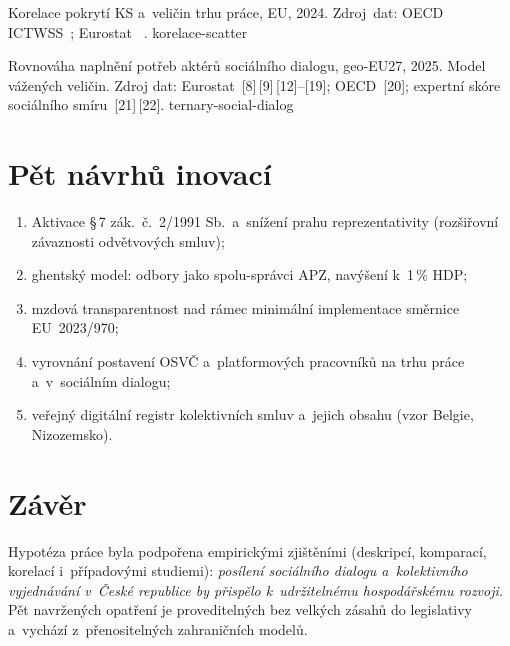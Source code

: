 \documentclass[czech]{CTUposter}
\begin{document}
\begin{posterbody}
\begin{minipage}[t]{0.485\linewidth}
    {Korelace pokrytí \acs{KS} a~veličin trhu práce, \acs{EU}, 2024. Zdroj~dat: \acs{OECD} \acs{ICTWSS}~\cite{oecd_aias_ictwss_CBC_ERB_pct}; Eurostat~\cite{eurostat_lfsa_ewhan2_HR_weekly} \cite{eurostat_gpg} \cite{eurostat_earn_nt_net_PPS_AW100} \cite{eurostat_nama_10_lp_ulc_NLPR_HW_EU27eq100}.}%
    {korelace-scatter}%
\end{minipage}%
\hfill%
\begin{minipage}[t]{0.485\linewidth}
  \nocite{eurostat_ilc_di01,eurostat_jvs_a_r21,eurostat_lc_lci_lev,eurostat_prc_ppp_ind_PLI_GDP,eurostat_nama_10_gdp,eurostat_nama_10_pc,eurostat_lfsi_emp_a,eurostat_ilc_di12,oecd_cts_cit,ilostat_STR_DAYS_ECO_RT_A,CMKOS_ZpravaKV2025}%
    {Rovnováha naplnění potřeb aktérů sociálního dialogu, \acs{geo-EU27}, 2025. Model vážených veličin. Zdroj dat: Eurostat~[8]\,[9]\,[12]--[19]; \acs{OECD}~[20]; expertní skóre sociálního smíru~[21]\,[22].}%
    {ternary-social-dialog}%
\end{minipage}%
\par\vspace{2mm}

\section{Pět návrhů inovací}
\begin{enumerate}
  \item Aktivace \S\,7 zák.\ č.\ 2/1991 Sb.\ a~snížení prahu reprezentativity (rozšiřovní závaznosti odvětvových smluv);
  \item ghentský model: odbory jako spolu-správci APZ, navýšení k~1\,\% HDP;
  \item mzdová transparentnost nad rámec minimální implementace směrnice EU~2023/970;
  \item vyrovnání postavení OSVČ a~platformových pracovníků na trhu práce a~v~sociálním dialogu;
  \item veřejný digitální registr kolektivních smluv a~jejich obsahu (vzor Belgie, Nizozemsko).
\end{enumerate}

\section{Závěr}
Hypotéza práce byla podpořena empirickými zjištěními (deskripcí, komparací, korelací i~případovými studiemi): \emph{posílení sociálního dialogu a~kolektivního vyjednávání v~České republice by přispělo k~udržitelnému hospodářskému rozvoji.} Pět
navržených opatření je proveditelných bez velkých zásahů do legislativy
a~vychází z~přenositelných zahraničních modelů.


\end{posterbody}
\end{document}
